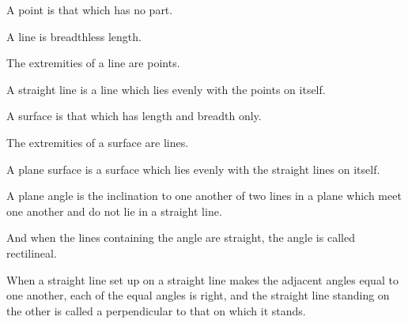 \documentclass{rrxiv}
\begin{document}
\begin{scope}
\label{def:I.1}
A point is that which has no part.
\end{scope}

\begin{scope}
\label{def:I.2}
A line is breadthless length.
\end{scope}

\begin{scope}
\label{def:I.3}
The extremities of a line are points.
\end{scope}

\begin{scope}
\label{def:I.4}
A straight line is a line which lies evenly with the points on itself.
\end{scope}

\begin{scope}
\label{def:I.5}
A surface is that which has length and breadth only.
\end{scope}

\begin{scope}
\label{def:I.6}
The extremities of a surface are lines.
\end{scope}

\begin{scope}
\label{def:I.7}
A plane surface is a surface which lies evenly with the straight lines
on itself.
\end{scope}

\begin{scope}
\label{def:I.8}
A plane angle is the inclination to one another of two lines in a
plane which meet one another and do not lie in a straight line.
\end{scope}

\begin{scope}
\label{def:I.9}
And when the lines containing the angle are straight, the angle is
called rectilineal.
\end{scope}

\begin{scope}
\label{def:I.10}
When a straight line set up on a straight line makes the adjacent
angles equal to one another, each of the equal angles is right, and
the straight line standing on the other is called a perpendicular to
that on which it stands.
\end{scope}
\end{document}
